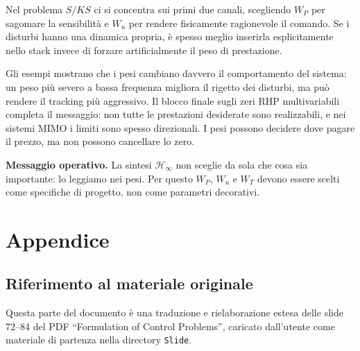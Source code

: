 \documentclass[11pt,a4paper]{article}
\begin{document}
Nel problema $S/KS$ ci si concentra sui primi due canali, scegliendo $W_P$ per sagomare la sensibilit\`a e $W_u$ per rendere fisicamente ragionevole il comando. Se i disturbi hanno una dinamica propria, \`e spesso meglio inserirla esplicitamente nello stack invece di forzare artificialmente il peso di prestazione.

Gli esempi mostrano che i pesi cambiano davvero il comportamento del sistema: un peso pi\`u severo a bassa frequenza migliora il rigetto dei disturbi, ma pu\`o rendere il tracking pi\`u aggressivo. Il blocco finale sugli zeri RHP multivariabili completa il messaggio: non tutte le prestazioni desiderate sono realizzabili, e nei sistemi MIMO i limiti sono spesso direzionali. I pesi possono decidere dove pagare il prezzo, ma non possono cancellare lo zero.

\begin{keybox}
\textbf{Messaggio operativo.} La sintesi $\mathcal{H}_\infty$ non sceglie da sola che cosa sia importante: lo leggiamo nei pesi. Per questo $W_P$, $W_u$ e $W_T$ devono essere scelti come specifiche di progetto, non come parametri decorativi.
\end{keybox}

\clearpage
{}
\section*{Appendice}

\subsection*{Riferimento al materiale originale}
{}

Questa parte del documento \`e una traduzione e rielaborazione estesa delle slide 72--84 del PDF ``Formulation of Control Problems'', caricato dall'utente come materiale di partenza nella directory \texttt{Slide}.
\end{document}
